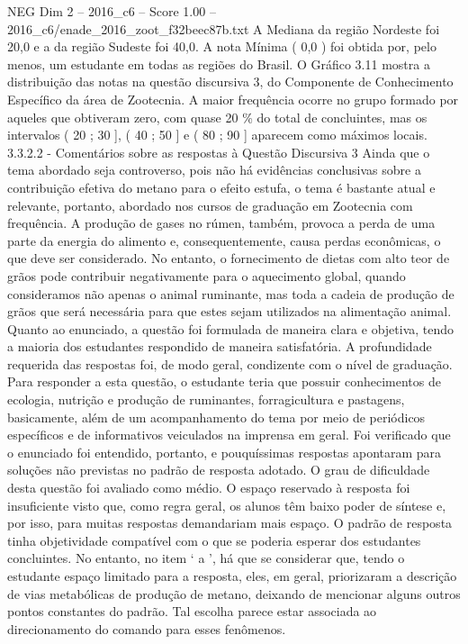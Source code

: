 \begin{textsample}{NEG Dim 2 – 2016\_c6 – Score 1.00 – 2016\_c6/enade\_2016\_zoot\_f32beec87b.txt}
A Mediana da região Nordeste foi 20,0 e a da região Sudeste foi 40,0.
A nota Mínima ( 0,0 ) foi obtida por, pelo menos, um estudante em todas as regiões do Brasil.
O Gráfico 3.11 mostra a distribuição das notas na questão discursiva 3, do Componente de Conhecimento Específico da área de Zootecnia.
A maior frequência ocorre no grupo formado por aqueles que obtiveram zero, com quase 20 \% do total de concluintes, mas os intervalos ( 20 ; 30 ], ( 40 ; 50 ] e ( 80 ; 90 ] aparecem como máximos locais. 3.3.2.2 - Comentários sobre as respostas à Questão Discursiva 3 Ainda que o tema abordado seja controverso, pois não há evidências conclusivas sobre a contribuição efetiva do metano para o efeito estufa, o tema é bastante atual e relevante, portanto, abordado nos cursos de graduação em Zootecnia com frequência.
A produção de gases no rúmen, também, provoca a perda de uma parte da energia do alimento e, consequentemente, causa perdas econômicas, o que deve ser considerado.
No entanto, o fornecimento de dietas com alto teor de grãos pode contribuir negativamente para o aquecimento global, quando consideramos não apenas o animal ruminante, mas toda a cadeia de produção de grãos que será necessária para que estes sejam utilizados na alimentação animal.
Quanto ao enunciado, a questão foi formulada de maneira clara e objetiva, tendo a maioria dos estudantes respondido de maneira satisfatória.
A profundidade requerida das respostas foi, de modo geral, condizente com o nível de graduação.
Para responder a esta questão, o estudante teria que possuir conhecimentos de ecologia, nutrição e produção de ruminantes, forragicultura e pastagens, basicamente, além de um acompanhamento do tema por meio de periódicos específicos e de informativos veiculados na imprensa em geral.
Foi verificado que o enunciado foi entendido, portanto, e pouquíssimas respostas apontaram para soluções não previstas no padrão de resposta adotado.
O grau de dificuldade desta questão foi avaliado como médio.
O espaço reservado à resposta foi insuficiente visto que, como regra geral, os alunos têm baixo poder de síntese e, por isso, para muitas respostas demandariam mais espaço.
O padrão de resposta tinha objetividade compatível com o que se poderia esperar dos estudantes concluintes.
No entanto, no item ‘ a ’, há que se considerar que, tendo o estudante espaço limitado para a resposta, eles, em geral, priorizaram a descrição de vias metabólicas de produção de metano, deixando de mencionar alguns outros pontos constantes do padrão.
Tal escolha parece estar associada ao direcionamento do comando para esses fenômenos.

\end{textsample}
